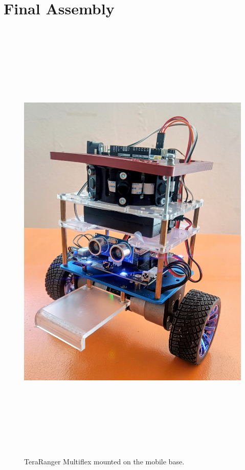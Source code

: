 \section{Final Assembly}
\begin{figure}[H]
	\centering
	\includegraphics[height=22cm]{assets/RobotFinalAssembly1.jpeg}
	\caption{TeraRanger Multiflex mounted on the mobile base.}
	\label{fig:terraAssembly1}
\end{figure}
